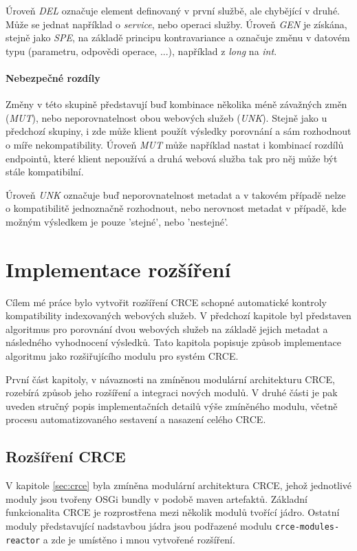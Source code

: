 \documentclass[czech,DP]{thesiskiv}
\begin{document}
Úroveň \textit{DEL} označuje element definovaný v první službě, ale chybějící v druhé. Může se jednat například o \textit{service}, nebo operaci služby. Úroveň \textit{GEN} je získána, stejně jako \textit{SPE}, na základě principu kontravariance a označuje změnu v datovém typu (parametru, odpovědi operace, ...), například z \textit{long} na \textit{int}. 

\subsubsection{Nebezpečné rozdíly}

Změny v této skupině představují buď kombinace několika méně závažných změn (\textit{MUT}), nebo neporovnatelnost obou webových služeb (\textit{UNK}). Stejně jako u předchozí skupiny, i zde může klient použít výsledky porovnání a sám rozhodnout o míře nekompatibility. Úroveň \textit{MUT} může například nastat i kombinací rozdílů endpointů, které klient nepoužívá a druhá webová služba tak pro něj může být stále kompatibilní.

Úroveň \textit{UNK} označuje buď neporovnatelnost metadat a v takovém případě nelze o kompatibilitě jednoznačně rozhodnout, nebo nerovnost metadat v případě, kde možným výsledkem je pouze 'stejné', nebo 'nestejné'.


\chapter{Implementace rozšíření}
\label{sec:impl}

Cílem mé práce bylo vytvořit rozšíření CRCE schopné automatické kontroly kompatibility indexovaných webových služeb. V předchozí kapitole byl představen algoritmus pro porovnání dvou webových služeb na základě jejich metadat a následného vyhodnocení výsledků. Tato kapitola popisuje způsob implementace algoritmu jako rozšiřujícího modulu pro systém CRCE.

První část kapitoly, v návaznosti na zmíněnou modulární architekturu CRCE, rozebírá způsob jeho rozšíření a integraci nových modulů. V druhé části je pak uveden stručný popis implementačních detailů výše zmíněného modulu, včetně procesu automatizovaného sestavení a nasazení celého CRCE.

\section{Rozšíření CRCE}

V kapitole \ref{sec:crce} byla zmíněna modulární architektura CRCE, jehož jednotlivé moduly jsou tvořeny OSGi bundly v podobě maven artefaktů. Základní funkcionalita CRCE je rozprostřena mezi několik modulů tvořící jádro. Ostatní moduly představující nadstavbou jádra jsou podřazené modulu \verb|crce-modules-reactor| a zde je umístěno i mnou vytvořené rozšíření.
\end{document}
